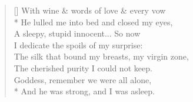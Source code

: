 \documentclass[MAIN]{subfiles}
\begin{document}
\settowidth{\versewidth}{The silk that bound my breasts, my virgin zone,}
\begin{verse}[\versewidth]
With wine \& words of love \& every vow\\*
\vin He lulled me into bed and closed my eyes,\\
A sleepy, stupid innocent... So now\\
\vin I dedicate the spoils of my surprise:\\
The silk that bound my breasts, my virgin zone,\\
\vin The cherished purity I could not keep.\\
Goddess, remember we were all alone,\\*
\vin And he was strong, and I was  asleep.
\end{verse}
\end{document}
